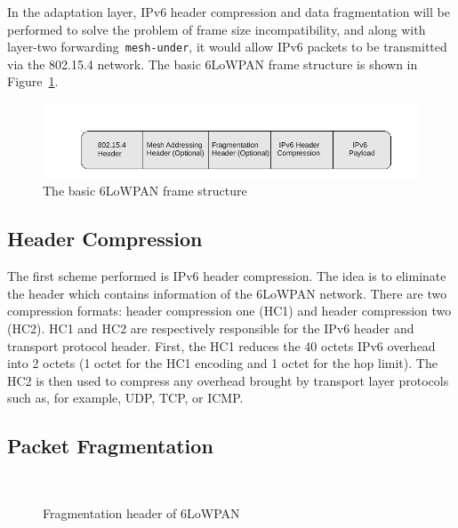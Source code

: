 In the adaptation layer, IPv6 header compression and data fragmentation will be performed to solve the problem of frame size incompatibility, and along with layer-two forwarding~\texttt{mesh-under}, it would allow IPv6 packets to be transmitted via the 802.15.4 network. The basic 6LoWPAN frame structure is shown in Figure~\ref{fig:Frame}.  

\begin{figure}[htbp]
  \begin{center}
    \leavevmode
     \includegraphics[scale=1]{Pics/Frame.pdf}%
    \caption{The basic 6LoWPAN frame structure}
    \label{fig:Frame}
  \end{center}
\end{figure}

\subsection{Header Compression}
\label{IETF:HC}
The first scheme performed is IPv6 header compression. The idea is to eliminate the
header which contains information of the 6LoWPAN network. There are two compression formats: header compression one (HC1) and header compression two (HC2)\@. HC1 and HC2 are respectively responsible for the IPv6 header and transport protocol header.  First, the HC1 reduces the 40 octets IPv6 overhead into 2 octets (1 octet for the HC1 encoding and 1 octet for the hop limit)\@. The HC2 is then used to compress any overhead brought by transport layer protocols such as, for example, UDP, TCP, or ICMP.

\subsection{Packet Fragmentation}
\label{IETF:PF}

\begin{figure}[htbp]
  \begin{center}
    \leavevmode
    \\
    \caption{Fragmentation header of 6LoWPAN}
    \label{fig:Fragmentation}
  \end{center}
\end{figure}

